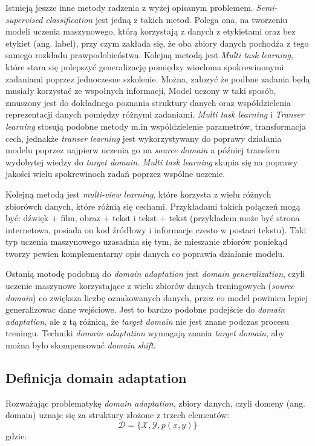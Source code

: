         \par
        Istnieją jeszze inne metody radzenia z wyżej opisanym problemem. \textit{Semi-supervised classification}\cite{semi-sup-learning} jest jedną z takich metod. Polega ona, na tworzeniu modeli uczenia maszynowego, którą korzystają z danych z etykietami oraz bez etykiet (ang. label), przy czym zakłada się, że oba zbiory danych pochodźa z tego samego rozkładu prawpodobieństwa. Kolejną metodą jest \textit{Multi task learning}\cite{multitask-learning}, które stara się polepszyć generalizację pomiędzy wioeloma spokrewinonymi zadaniami poprzez jednoczesne szkolenie. Można, załozyć że podbne zadania będą musiały korzystać ze wspołnych informacji, Model uczony w taki sposób, zmuszony jest do dokładnego poznania struktury danych oraz współdzielenia reprezentacji danych pomiędzy różnymi zadaniami. \textit{Multi task learning} i \textit{Transer learning} stosują podobne metody m.in wspóldzielenie parametrów, transformacja cech, jednakże \textit{transer learning} jest wykorzystywany do poprawy działania modelu poprzez najpierw uczenia go na \textit{source domain} a później transferu wydobytej wiedzy do \textit{target domain}. \textit{Multi task learning} skupia się na poprawy jakości wielu spokrewinoch zadań poprzez wspólne uczenie.
        \par
        Kolejną metodą jest \textit{multi-view learning}, które korzysta z wielu różnych zbiorówch danych, które różnią się cechami. Przykładami takich połączeń mogą być: dźwięk + film, obraz + tekst i tekst + tekst (przykładem może być strona internetowa, posiada on kod źródłowy i informacje czesto w postaci tekstu). Taki typ uczenia maszynowego uzasadnia się tym, że mieszanie zbiorów poniekąd tworzy pewien komplementarny opis danych co poprawia działanie modelu. 
        \par
        Ostanią motodę podobną do \textit{domain adaptation} jest \textit{domain generalization}\cite{domain-generalization}, czyli uczenie maszynowe korzystające z wielu zbiorów danych treningowych (\textit{source domain}) co zwiększa liczbę oznakowanych danych, przez co model powinien lepiej generalizowac dane wejściowe. Jest to bardzo podobne podejście do \textit{domain adaptation}, ale z tą różnicą, że \textit{target domain} nie jest znane podczas procesu treningu. Techniki \textit{domain adaptation} wymagają znania \textit{target domain}, aby można było skompensować \textit{domain shift}.
        
        \subsection{Definicja domain adaptation}
            Rozważając problematykę \textit{domain adaptation}, zbiory danych, czyli domeny (ang. domain) uznaje się za struktury złożone z trzech elementów:
            \begin{equation*}
                \mathcal{D} = \{\mathcal{X},\mathcal{Y},p(x,y)\}
            \end{equation*}
            gdzie:
            

